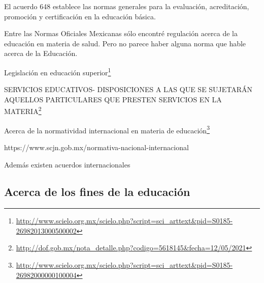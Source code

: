 \documentclass[
  12,
]{scrartcl}
\DeclareRobustCommand{\href}[2]{#2\footnote{\url{#1}}}
\begin{document}
El acuerdo 648 establece las normas generales para la evaluación,
acreditación, promoción y certificación en la educación básica.

Entre las Normas Oficiales Mexicanas sólo encontré regulación acerca de
la educación en materia de salud. Pero no parece haber alguna norma que
hable acerca de la Educación.

\href{http://www.scielo.org.mx/scielo.php?script=sci_arttext\&pid=S0185-26982013000500002}{Legislación
en educación superior}

\href{http://dof.gob.mx/nota_detalle.php?codigo=5618145\&fecha=12/05/2021}{SERVICIOS
EDUCATIVOS- DISPOSICIONES A LAS QUE SE SUJETARÁN AQUELLOS PARTICULARES
QUE PRESTEN SERVICIOS EN LA MATERIA}

\href{http://www.scielo.org.mx/scielo.php?script=sci_arttext\&pid=S0185-26982000000100004}{Acerca
de la normatividad internacional en materia de educación}

https://www.scjn.gob.mx/normativa-nacional-internacional

Además existen acuerdos internacionales

\hypertarget{acerca-de-los-fines-de-la-educaciuxf3n}{%
\subsection{Acerca de los fines de la
educación}\label{acerca-de-los-fines-de-la-educaciuxf3n}}
\end{document}
